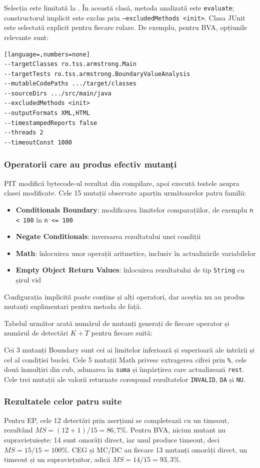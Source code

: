\documentclass[11pt,a4paper]{article}
\begin{document}
Selecția este limitată la .
În această clasă, metoda analizată este \texttt{evaluate}; constructorul
implicit este exclus prin \texttt{--excludedMethods <init>}.
Clasa JUnit este selectată explicit pentru fiecare rulare.
De exemplu, pentru BVA, opțiunile relevante sunt:
\begin{lstlisting}[language=,numbers=none]
--targetClasses ro.tss.armstrong.Main
--targetTests ro.tss.armstrong.BoundaryValueAnalysis
--mutableCodePaths .../target/classes
--sourceDirs .../src/main/java
--excludedMethods <init>
--outputFormats XML,HTML
--timestampedReports false
--threads 2
--timeoutConst 1000
\end{lstlisting}

\subsubsection{Operatorii care au produs efectiv mutanți}
PIT modifică bytecode-ul rezultat din compilare, apoi execută testele
asupra clasei modificate. Cele 15 mutații observate aparțin următoarelor
patru familii:
\begin{itemize}[label=\textbullet]
\item \textbf{Conditionals Boundary}: modificarea limitelor comparațiilor, de exemplu \texttt{n < 100} în \texttt{n <= 100}
\item \textbf{Negate Conditionals}: inversarea rezultatului unei condiții
\item \textbf{Math}: înlocuirea unor operații aritmetice, inclusiv în actualizările variabilelor
\item \textbf{Empty Object Return Values}: înlocuirea rezultatului de tip \texttt{String} cu șirul vid
\end{itemize}
Configurația implicită poate conține și alți operatori, dar aceștia nu au
produs mutanți suplimentari pentru metoda de față.

Tabelul următor arată numărul de mutanți generați de fiecare operator și
numărul de detectări $K+T$ pentru fiecare suită:

Cei 3 mutanți Boundary sunt cei ai limitelor inferioară și superioară
ale intrării și cel al condiției buclei.
Cele 5 mutații Math privesc extragerea cifrei prin \texttt{\%}, cele două înmulțiri din cub, adunarea în \texttt{suma} și împărțirea care actualizează \texttt{rest}.
Cele trei mutații ale valorii returnate corespund rezultatelor
\texttt{INVALID}, \texttt{DA} și \texttt{NU}.

\subsubsection{Rezultatele celor patru suite}

Pentru EP, cele 12 detectări prin aserțiuni se completează cu un timeout,
rezultând $MS=(12+1)/15=86{,}7\%$.
Pentru BVA, niciun mutant nu supraviețuiește: 14 sunt omorâți direct,
iar unul produce timeout, deci $MS=15/15=100\%$.
CEG și MC/DC au fiecare 13 mutanți omorâți direct, un timeout și un
supraviețuitor, adică $MS=14/15=93{,}3\%$.
\end{document}
